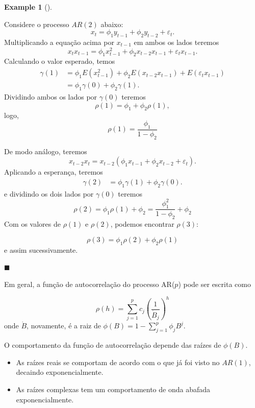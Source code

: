 \documentclass[
  letterpaper,
  DIV=11,
  numbers=noendperiod]{scrartcl}
\theoremstyle{plain}
\theoremstyle{plain}
\theoremstyle{definition}
\newtheorem{example}{Example}[chapter]
\theoremstyle{definition}
\theoremstyle{remark}
\begin{document}
\begin{example}[]\protect\hypertarget{exm-}{}\label{exm-}

Considere o processo \(AR(2)\) abaixo:
\[x_{t}=\phi_1y_{t-1}+\phi_2y_{t-2}+\varepsilon_t.\] Multiplicando a
equação acima por \(x_{t-1}\) em ambos os lados teremos
\[x_{t}x_{t-1}=\phi_1x_{t-1}^2+\phi_2x_{t-2}x_{t-1}+\varepsilon_t x_{t-1}.\]
Calculando o valor esperado, temos \[\begin{align*}
    \gamma(1)&=\phi_1E(x_{t-1}^2)+\phi_2E(x_{t-2}x_{t-1})+E(\varepsilon_t x_{t-1})\\
    &=\phi_1\gamma(0) + \phi_2\gamma(1).
    \end{align*}\] Dividindo ambos os lados por \(\gamma(0)\) teremos
\[\rho(1)=\phi_1+\phi_2\rho(1),\] logo,
\[\rho(1)=\frac{\phi_1}{1-\phi_2}
\]

De modo análogo, teremos
\[x_{t-2} x_{t}=x_{t-2}\left(\phi_1x_{t-1}+\phi_2x_{t-2}+\varepsilon_{t}\right).\]
Aplicando a esperança, teremos \[\begin{align*}
    \gamma(2)&=\phi_1 \gamma(1)+\phi_2\gamma(0).
    \end{align*}\] e dividindo os dois lados por \(\gamma(0)\) teremos\\
\[\rho(2)=\phi_1\rho(1)+\phi_2=\frac{\phi_1^2}{1-\phi_2}+\phi_2\] Com os
valores de \(\rho(1)\) e \(\rho(2)\), podemos encontrar \(\rho(3)\):

\[\rho(3)=\phi_1\rho(2)+\phi_2\rho(1)\] e assim sucessivamente.

\(\blacksquare\)

\end{example}

Em geral, a função de autocorrelação do processo AR(\(p\)) pode ser
escrita como

\[\rho(h)=\sum_{j=1}^p c_j\left(\frac{1}{\dot{B}_j}\right)^h\] onde
\(\dot{B}\), novamente, é a raiz de
\(\phi(B)=1-\sum_{j=1}^p \phi_j B^j\).

O comportamento da função de autocorrelação depende das raízes de
\(\phi(B)\).

\begin{itemize}
\item
  As raízes reais se comportam de acordo com o que já foi visto no
  \(AR(1)\), decaindo exponencialmente.
\item
  As raízes complexas tem um comportamento de onda abafada
  exponencialmente.
\end{itemize}
\end{document}
